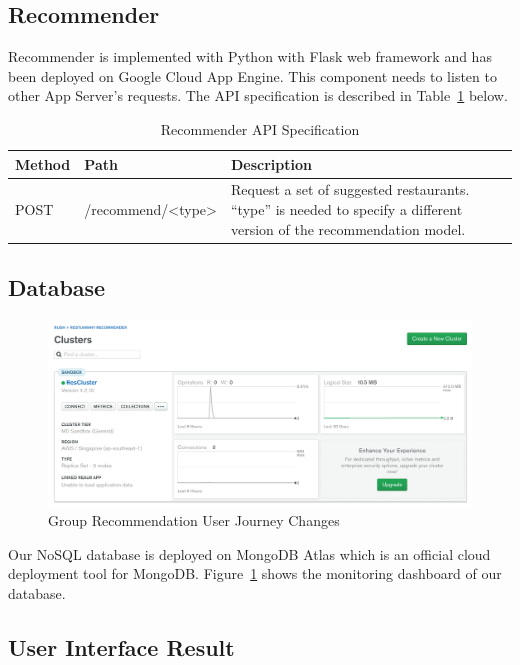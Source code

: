\documentclass[12pt,oneside,openright,a4paper]{cpe-english-project}
\begin{document}
\subsection{Recommender}

Recommender is implemented with Python with Flask web framework and has been deployed on Google Cloud App Engine. This component needs to listen to other App Server’s requests. The API specification is described in Table~\ref{tbl:4RecommenderAPISpecification} below.

\begin{table}[H]
\caption{Recommender API Specification}\label{tbl:4RecommenderAPISpecification}
\begin{tabularx}{\textwidth}{l|l|X} \hline\hline
Method & Path & Description \\ \hline\hline
POST & /recommend/<type> & Request a set of suggested restaurants. “type” is needed to specify a different version of the recommendation model. \\ \hline\hline
\end{tabularx}
\end{table}

\subsection{Database}

\begin{figure}[H]\centering
\includegraphics[width=400pt]{./images/4mongodashboard.png}
\caption{Group Recommendation User Journey Changes}\label{fig:4mongodashboard}
\end{figure}\vspace{-24pt}

Our NoSQL database is deployed on MongoDB Atlas which is an official cloud deployment tool for MongoDB. Figure~\ref{fig:4mongodashboard} shows the monitoring dashboard of our database.


\subsection{User Interface Result}
\end{document}
